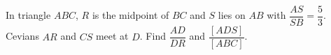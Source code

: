 In triangle $ABC$, $R$ is the midpoint of $BC$ and $S$ lies on $AB$ with $\dfrac{AS}{SB}=\dfrac53$. Cevians $AR$ and $CS$ meet at $D$. Find $\dfrac{AD}{DR}$ and $\dfrac{[ADS]}{[ABC]}$.

